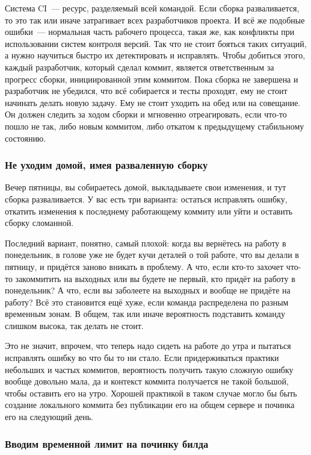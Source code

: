 \documentclass{../../text-style}
\begin{document}
Система CI~--- ресурс, разделяемый всей командой. Если сборка разваливается, то это так или иначе затрагивает всех разработчиков проекта. И всё же подобные ошибки~--- нормальная часть рабочего процесса, такая же, как конфликты при использовании систем контроля версий. Так что не стоит бояться таких ситуаций, а нужно научиться быстро их детектировать и исправлять. Чтобы добиться этого, каждый разработчик, который сделал коммит, является ответственным за прогресс сборки, инициированной этим коммитом. Пока сборка не завершена и разработчик не убедился, что всё собирается и тесты проходят, ему не стоит начинать делать новую задачу. Ему не стоит уходить на обед или на совещание. Он должен следить за ходом сборки и мгновенно отреагировать, если что-то пошло не так, либо новым коммитом, либо откатом к предыдущему стабильному состоянию.

\subsubsection{Не уходим домой, имея разваленную сборку}

Вечер пятницы, вы собираетесь домой, выкладываете свои изменения, и тут сборка разваливается. У вас есть три варианта: остаться исправлять ошибку, откатить изменения к последнему работающему коммиту или уйти и оставить сборку сломанной.

Последний вариант, понятно, самый плохой: когда вы вернётесь на работу в понедельник, в голове уже не будет кучи деталей о той работе, что вы делали в пятницу, и придётся заново вникать в проблему. А что, если кто-то захочет что-то закоммитить на выходных или вы будете не первый, кто придёт на работу в понедельник? А что, если вы заболеете на выходных и вообще не придёте на работу? Всё это становится ещё хуже, если команда распределена по разным временным зонам. В общем, так или иначе вероятность подставить команду слишком высока, так делать не стоит.

Это не значит, впрочем, что теперь надо сидеть на работе до утра и пытаться исправлять ошибку во что бы то ни стало. Если придерживаться практики небольших и частых коммитов, вероятность получить такую сложную ошибку вообще довольно мала, да и контекст коммита получается не такой большой, чтобы оставить его на утро. Хорошей практикой в таком случае могло бы быть создание локального коммита без публикации его на общем сервере и починка его на следующий день.

\subsubsection{Вводим временной лимит на починку билда}
\end{document}
